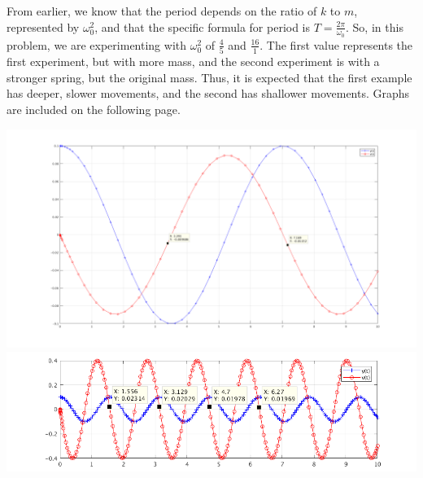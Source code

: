 \begin{itemize}
    From earlier, we know that the period depends on the ratio of $k$ to $m$, represented by $\omega_0^2$, and that the specific formula for period is $T = \frac{2\pi}{\omega_0}$. So, in this problem, we are experimenting with $\omega_0^2$ of $\frac{4}{5}$ and $\frac{16}{1}$.
    The first value represents the first experiment, but with more mass, and the second experiment is with a stronger spring, but the original mass. Thus, it is expected that the first example has deeper, slower movements, and the second has shallower movements. Graphs are included on the following page.

    \includegraphics[scale=0.3]{1.png} \\
\includegraphics[scale=0.6]{2.png}

\end{itemize}
